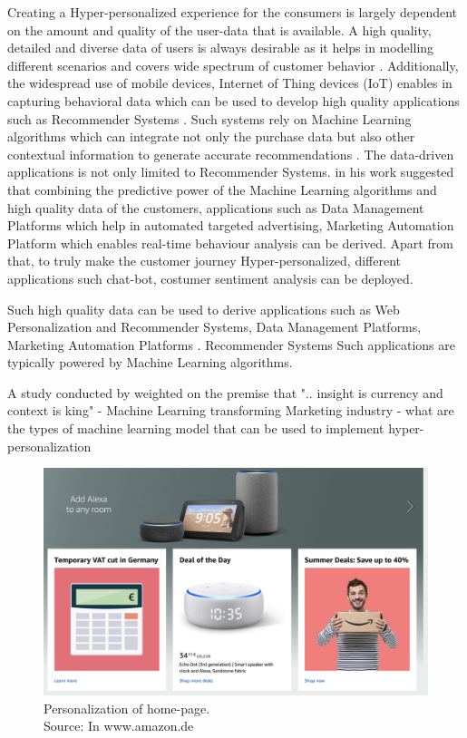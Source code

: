 Creating a Hyper-personalized experience for the consumers is largely dependent on the amount and quality of the user-data that is available. A high quality, detailed and diverse data of users is always desirable as it helps in modelling different scenarios and covers wide spectrum of customer behavior \autocite[8]{CapgeminiconsultingESSECBusinessSchool2016}. Additionally, the widespread use of mobile devices, Internet of Thing devices (IoT) enables in capturing behavioral data which can be used to develop high quality applications such as Recommender Systems \autocite[8]{CapgeminiconsultingESSECBusinessSchool2016}. Such systems rely on Machine Learning algorithms which can integrate not only the purchase data but also other contextual information to generate accurate recommendations \autocite[67]{Adomavicius2011}. The data-driven applications is not only limited to Recommender Systems. \autocite[3]{Sodhi} in his work suggested that combining the predictive power of the Machine Learning algorithms and high quality data of the customers, applications such as Data Management Platforms which help in automated targeted advertising, Marketing Automation Platform which enables real-time behaviour analysis can be derived. Apart from that, to truly make the customer journey Hyper-personalized, different applications such chat-bot, costumer sentiment analysis can be deployed.


Such high quality data can be used to derive applications such as Web Personalization and Recommender Systems, Data Management Platforms, Marketing Automation Platforms \autocite[3]{Sodhi}. Recommender Systems 
Such applications are typically powered by Machine Learning algorithms. 

A study conducted by \textcite{Bradley2015} weighted on the premise that  ".. insight is currency and context is king"
- Machine Learning transforming Marketing industry
- what are the types of machine learning model that can be used to implement hyper-personalization

 
\begin{figure}
    \centering
    \includegraphics[scale=0.3]{chapters/figures/amazon_homepage.png}
    \caption{Personalization of home-page. \\
    Source: In www.amazon.de}
    \label{fig:amazon_home_page}
\end{figure}
